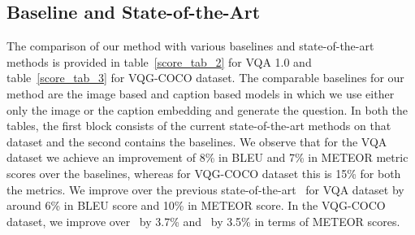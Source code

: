 \documentclass[11pt,a4paper]{article}
\begin{document}
\subsection{Baseline and State-of-the-Art}\label{baseline_sota}
The comparison of our method with various baselines and state-of-the-art methods is provided in table~\ref{score_tab_2} for VQA 1.0 and table~\ref{score_tab_3} for VQG-COCO dataset. The comparable baselines for our method are the image based and caption based models in which we use either only the image or the caption embedding and generate the question. In both the tables, the first block consists of the current state-of-the-art methods on that dataset and the second  contains the baselines. We observe that for the VQA dataset we achieve an improvement of 8\% in BLEU and 7\% in METEOR metric scores over the baselines, whereas for VQG-COCO dataset this is 15\% for both the metrics. We improve over the previous state-of-the-art~\cite{Yang_arXiv2015} for VQA dataset by around 6\% in BLEU score and 10\% in METEOR score. In the VQG-COCO dataset, we improve over~\cite{mostafazadeh2016generating} by 3.7\% and~\cite{jain2017creativity} by 3.5\% in terms of METEOR scores.
\end{document}
